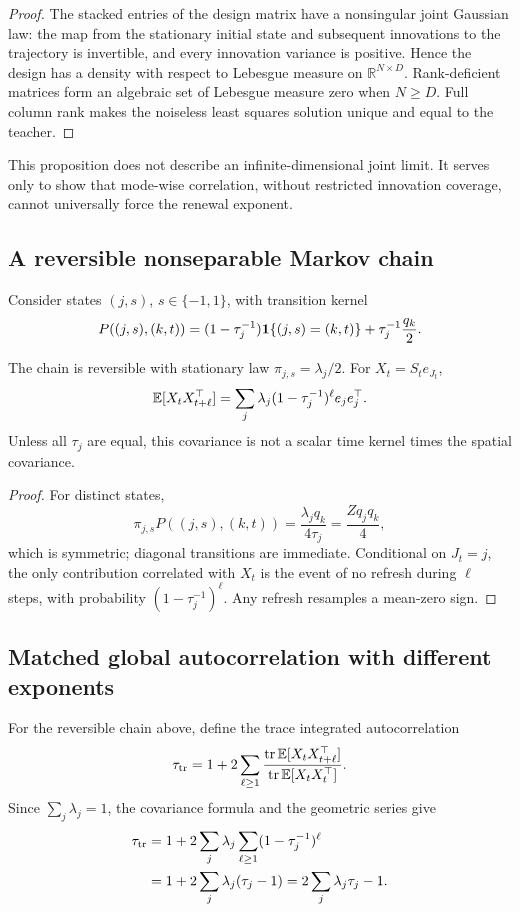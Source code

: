 \begin{proof}
The stacked entries of the design matrix have a nonsingular joint Gaussian
law: the map from the stationary initial state and subsequent innovations to
the trajectory is invertible, and every innovation variance is positive.
Hence the design has a density with respect to Lebesgue measure on
$\mathbb R^{N\times D}$. Rank-deficient matrices form an algebraic set of
Lebesgue measure zero when $N\ge D$. Full column rank makes the noiseless least
squares solution unique and equal to the teacher.
\end{proof}

This proposition does not describe an infinite-dimensional joint limit. It
serves only to show that mode-wise correlation, without restricted innovation
coverage, cannot universally force the renewal exponent.

\subsection{A reversible nonseparable Markov chain}
Consider states $(j,s)$, $s\in\{-1,1\}$, with transition kernel
\[
P((j,s),(k,t))=
(1-\tau_j^{-1})\mathbf{1}\{(j,s)=(k,t)\}
+\tau_j^{-1}\frac{q_k}{2}.
\]

\begin{proposition}
The chain is reversible with stationary law $\pi_{j,s}=\lambda_j/2$. For
$X_t=S_te_{J_t}$,
\[
\mathbb{E}[X_tX_{t+\ell}^\top]
=\sum_j\lambda_j(1-\tau_j^{-1})^\ell e_je_j^\top.
\]
Unless all $\tau_j$ are equal, this covariance is not a scalar time kernel
times the spatial covariance.
\end{proposition}

\begin{proof}
For distinct states,
\[
\pi_{j,s}P((j,s),(k,t))
=\frac{\lambda_jq_k}{4\tau_j}
=\frac{Zq_jq_k}{4},
\]
which is symmetric; diagonal transitions are immediate. Conditional on
$J_t=j$, the only contribution correlated with $X_t$ is the event of no
refresh during $\ell$ steps, with probability
$(1-\tau_j^{-1})^\ell$. Any refresh resamples a mean-zero sign.
\end{proof}

\subsection{Matched global autocorrelation with different exponents}
For the reversible chain above, define the trace integrated autocorrelation
\[
\tau_{\rm tr}
=1+2\sum_{\ell\ge1}
\frac{\operatorname{tr}\mathbb{E}[X_tX_{t+\ell}^\top]}
{\operatorname{tr}\mathbb{E}[X_tX_t^\top]}.
\]
Since $\sum_j\lambda_j=1$, the covariance formula and the geometric series give
\begin{align*}
\tau_{\rm tr}
&=1+2\sum_j\lambda_j\sum_{\ell\ge1}(1-\tau_j^{-1})^\ell\\
&=1+2\sum_j\lambda_j(\tau_j-1)
=2\sum_j\lambda_j\tau_j-1.
\end{align*}

